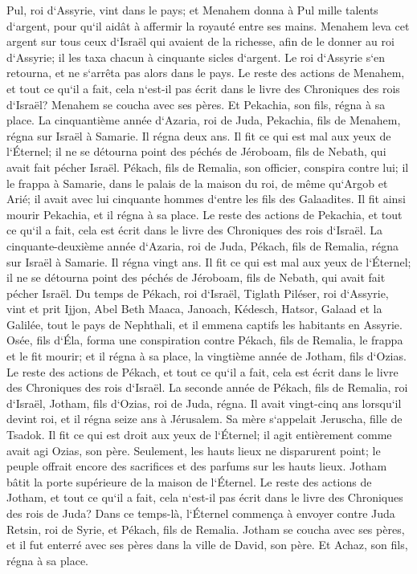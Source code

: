 \verse Pul, roi d`Assyrie, vint dans le pays; et Menahem donna à Pul mille talents d`argent, pour qu`il aidât à affermir la royauté entre ses mains. 
\verse Menahem leva cet argent sur tous ceux d`Israël qui avaient de la richesse, afin de le donner au roi d`Assyrie; il les taxa chacun à cinquante sicles d`argent. Le roi d`Assyrie s`en retourna, et ne s`arrêta pas alors dans le pays. 
\verse Le reste des actions de Menahem, et tout ce qu`il a fait, cela n`est-il pas écrit dans le livre des Chroniques des rois d`Israël? 
\verse Menahem se coucha avec ses pères. Et Pekachia, son fils, régna à sa place. 
\verse La cinquantième année d`Azaria, roi de Juda, Pekachia, fils de Menahem, régna sur Israël à Samarie. Il régna deux ans. 
\verse Il fit ce qui est mal aux yeux de l`Éternel; il ne se détourna point des péchés de Jéroboam, fils de Nebath, qui avait fait pécher Israël. 
\verse Pékach, fils de Remalia, son officier, conspira contre lui; il le frappa à Samarie, dans le palais de la maison du roi, de même qu`Argob et Arié; il avait avec lui cinquante hommes d`entre les fils des Galaadites. Il fit ainsi mourir Pekachia, et il régna à sa place. 
\verse Le reste des actions de Pekachia, et tout ce qu`il a fait, cela est écrit dans le livre des Chroniques des rois d`Israël. 
\verse La cinquante-deuxième année d`Azaria, roi de Juda, Pékach, fils de Remalia, régna sur Israël à Samarie. Il régna vingt ans. 
\verse Il fit ce qui est mal aux yeux de l`Éternel; il ne se détourna point des péchés de Jéroboam, fils de Nebath, qui avait fait pécher Israël. 
\verse Du temps de Pékach, roi d`Israël, Tiglath Piléser, roi d`Assyrie, vint et prit Ijjon, Abel Beth Maaca, Janoach, Kédesch, Hatsor, Galaad et la Galilée, tout le pays de Nephthali, et il emmena captifs les habitants en Assyrie. 
\verse Osée, fils d`Éla, forma une conspiration contre Pékach, fils de Remalia, le frappa et le fit mourir; et il régna à sa place, la vingtième année de Jotham, fils d`Ozias. 
\verse Le reste des actions de Pékach, et tout ce qu`il a fait, cela est écrit dans le livre des Chroniques des rois d`Israël. 
\verse La seconde année de Pékach, fils de Remalia, roi d`Israël, Jotham, fils d`Ozias, roi de Juda, régna. 
\verse Il avait vingt-cinq ans lorsqu`il devint roi, et il régna seize ans à Jérusalem. Sa mère s`appelait Jeruscha, fille de Tsadok. 
\verse Il fit ce qui est droit aux yeux de l`Éternel; il agit entièrement comme avait agi Ozias, son père. 
\verse Seulement, les hauts lieux ne disparurent point; le peuple offrait encore des sacrifices et des parfums sur les hauts lieux. Jotham bâtit la porte supérieure de la maison de l`Éternel. 
\verse Le reste des actions de Jotham, et tout ce qu`il a fait, cela n`est-il pas écrit dans le livre des Chroniques des rois de Juda? 
\verse Dans ce temps-là, l`Éternel commença à envoyer contre Juda Retsin, roi de Syrie, et Pékach, fils de Remalia. 
\verse Jotham se coucha avec ses pères, et il fut enterré avec ses pères dans la ville de David, son père. Et Achaz, son fils, régna à sa place. 

